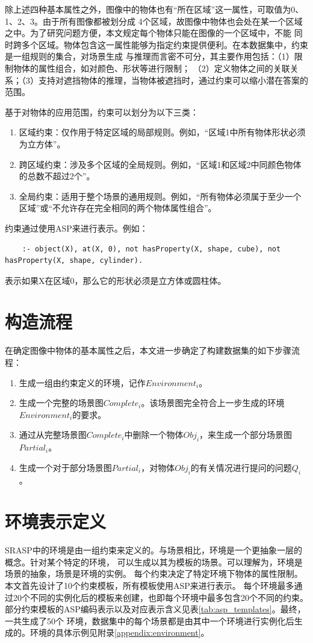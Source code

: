 除上述四种基本属性之外，图像中的物体也有“所在区域”这一属性，可取值为0、1、2、3。由于所有图像都被划分成
4个区域，故图像中物体也会处在某一个区域之中。为了研究问题方便，本文规定每个物体只能在图像的一个区域中，不能
同时跨多个区域。物体包含这一属性能够为指定约束提供便利。在本数据集中，约束是一组规则的集合，对场景生成
与推理而言密不可分，其主要作用包括：（1）限制物体的属性组合，如对颜色、形状等进行限制；
（2）定义物体之间的关联关系；（3）支持对遮挡物体的推理，当物体被遮挡时，通过约束可以缩小潜在答案的范围。

基于对物体的应用范围，约束可以划分为以下三类：
\begin{enumerate}[itemsep=0pt,parsep=0pt]
    \item 区域约束：仅作用于特定区域的局部规则。例如，“区域1中所有物体形状必须为立方体”。
    \item 跨区域约束：涉及多个区域的全局规则。例如，“区域1和区域2中同颜色物体的总数不超过2个”。
    \item 全局约束：适用于整个场景的通用规则。例如，“所有物体必须属于至少一个区域”或“不允许存在完全相同的两个物体属性组合”。
\end{enumerate}

约束通过使用ASP来进行表示。例如：
\begin{lstlisting}
    :- object(X), at(X, 0), not hasProperty(X, shape, cube), not hasProperty(X, shape, cylinder).
\end{lstlisting}
表示如果X在区域0，那么它的形状必须是立方体或圆柱体。

\section{构造流程}
在确定图像中物体的基本属性之后，本文进一步确定了构建数据集的如下步骤流程：
\begin{enumerate}[itemsep=0pt,parsep=0pt]
\item 生成一组由约束定义的环境，记作$Environment_i$。
\item 生成一个完整的场景图$Complete_i$。该场景图完全符合上一步生成的环境$Environment_i$的要求。
\item 通过从完整场景图$Complete_i$中删除一个物体$Obj_i$，来生成一个部分场景图$Partial_i$。
\item 生成一个对于部分场景图$Partial_i$，对物体$Obj_i$的有关情况进行提问的问题$Q_i$。
\end{enumerate}

\section{环境表示定义}
SRASP中的环境是由一组约束来定义的。与场景相比，环境是一个更抽象一层的概念。针对某个特定的环境，
可以生成以其为模板的场景。可以理解为，环境是场景的抽象，场景是环境的实例。
每个约束决定了特定环境下物体的属性限制。本文首先设计了10个约束模板，所有模板使用ASP来进行表示。
每个环境最多通过20个不同的实例化后的模板来创建，也即每个环境中最多包含20个不同的约束。
部分约束模板的ASP编码表示以及对应表示含义见表\ref{tab:asp_templates}。最终，一共生成了50个
环境，数据集中的每个场景都是由其中一个环境进行实例化后生成的。环境的具体示例见附录\ref{appendix:environment}。

